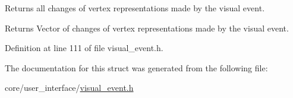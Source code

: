 Returns all changes of vertex representations made by the visual event. 

\begin{DoxyReturn}{Returns}
Vector of changes of vertex representations made by the visual event. 
\end{DoxyReturn}


Definition at line 111 of file visual\+\_\+event.\+h.



The documentation for this struct was generated from the following file\+:\begin{DoxyCompactItemize}
\item 
core/user\+\_\+interface/\hyperlink{visual__event_8h}{visual\+\_\+event.\+h}\end{DoxyCompactItemize}
